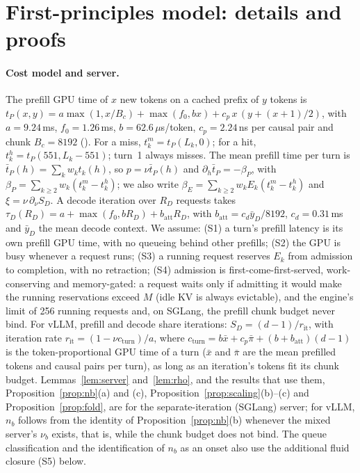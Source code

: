 \section{First-principles model: details and proofs}\label{app:fp}

\paragraph{Cost model and server.} The prefill GPU time of $x$ new tokens on a cached prefix of $y$ tokens is $t_P(x,y)=a\max(1,x/B_c)+\max(f_0,bx)+c_p\,x\,(y+(x+1)/2)$, with $a=9.24$\,ms, $f_0=1.26$\,ms, $b=62.6\,\mu$s/token, $c_p=2.24$\,ns per causal pair and chunk $B_c=8192$ (). For a miss, $t^m_k=t_P(L_k,0)$; for a hit, $t^h_k=t_P(551,L_k-551)$; turn~1 always misses. The mean prefill time per turn is $\bar t_P(h)=\sum_kw_kt_k(h)$, so $p=\nu\bar t_P(h)$ and $\partial_h\bar t_P=-\beta_P$, with $\beta_P=\sum_{k\ge2}w_k(t^m_k-t^h_k)$; we also write $\beta_E=\sum_{k\ge2}w_kE_k(t^m_k-t^h_k)$ and $\xi=\nu\,\partial_\nu S_D$. A decode iteration over $R_D$ requests takes $\tau_D(R_D)=a+\max(f_0,bR_D)+b_{\mathrm{att}}R_D$, with $b_{\mathrm{att}}=c_d\bar y_D/8192$, $c_d=0.31$\,ms and $\bar y_D$ the mean decode context. We assume: (S1) a turn's prefill latency is its own prefill GPU time, with no queueing behind other prefills; (S2) the GPU is busy whenever a request runs; (S3) a running request reserves $E_k$ from admission to completion, with no retraction; (S4) admission is first-come-first-served, work-conserving and memory-gated: a request waits only if admitting it would make the running reservations exceed $M$ (idle KV is always evictable), and the engine's limit of 256 running requests and, on SGLang, the prefill chunk budget never bind. For vLLM, prefill and decode share iterations: $S_D=(d-1)/r_{\mathrm{it}}$, with iteration rate $r_{\mathrm{it}}=(1-\nu c_{\mathrm{turn}})/a$, where $c_{\mathrm{turn}}=b\bar x+c_p\bar\pi+(b+b_{\mathrm{att}})(d-1)$ is the token-proportional GPU time of a turn ($\bar x$ and $\bar\pi$ are the mean prefilled tokens and causal pairs per turn), as long as an iteration's tokens fit its chunk budget. Lemmas~\ref{lem:server} and~\ref{lem:rho}, and the results that use them, Proposition~\ref{prop:nb}(a) and (c), Proposition~\ref{prop:scaling}(b)--(c) and Proposition~\ref{prop:fold}, are for the separate-iteration (SGLang) server; for vLLM, $n_b$ follows from the identity of Proposition~\ref{prop:nb}(b) whenever the mixed server's $\nu_b$ exists, that is, while the chunk budget does not bind. The queue classification and the identification of $n_b$ as an onset also use the additional fluid closure (S5) below.

